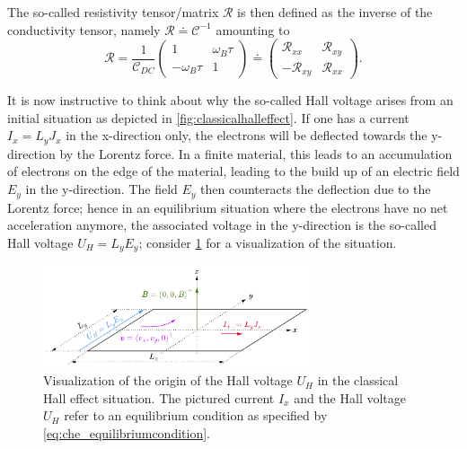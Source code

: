 \documentclass{report}
\numberwithin{tm}{section}
\newcommand\matr[1]{\ensuremath{\boldsymbol{\mathbf{#1}}}}
\begin{document}
	The so-called resistivity tensor/matrix $\matr{\mathcal{R}}$ is then defined as the inverse of the conductivity tensor, namely $\matr{\mathcal{R}} \doteq \matr{\mathcal{C}}^{-1}$ amounting to \begin{equation}\label{eq:resistivitytensor}
	\matr{\mathcal{R}} = \frac{1}{\mathcal{C}_{DC}} \begin{pmatrix}
	1 & \omega_B\tau \\ -\omega_B\tau & 1
	\end{pmatrix} \doteq \begin{pmatrix}
	\mathcal{R}_{xx} & \mathcal{R}_{xy} \\ -\mathcal{R}_{xy} & \mathcal{R}_{xx}
	\end{pmatrix}.
	\end{equation}
	
	It is now instructive to think about why the so-called Hall voltage arises from an initial situation as depicted in \cref{fig:classicalhalleffect}. If one has a current $I_x = L_yJ_x$ in the x-direction only, the electrons will be deflected towards the y-direction by the Lorentz force. In a finite material, this leads to an accumulation of electrons on the edge of the material, leading to the build up of an electric field $E_y$ in the y-direction. The field $E_y$ then counteracts the deflection due to the Lorentz force; hence in an equilibrium situation where the electrons have no net acceleration anymore, the associated voltage in the y-direction is the so-called Hall voltage $U_H = L_yE_y$; consider \cref{fig:classicalhalleffect_soph} for a visualization of the situation.
	\begin{figure}[h]
		\centering
		\includegraphics[width=0.7\textwidth]{figures/classicalhalleffect_soph.pdf}
		\caption{Visualization of the origin of the Hall voltage $U_H$ in the classical Hall effect situation. The pictured current $I_x$ and the Hall voltage $U_H$ refer to an equilibrium condition as specified by \cref{eq:che_equilibriumcondition}.}
		\label{fig:classicalhalleffect_soph}
	\end{figure}
	
\end{document}
